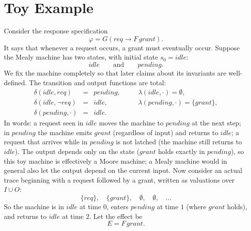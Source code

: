 \documentclass[11pt]{article}
\theoremstyle{remark}
\begin{document}
\section{Toy Example}
\label{sec:toy}

Consider the response specification
\[
  \varphi = G(req\rightarrow F\,grant).
\]
It says that whenever a request occurs, a grant must eventually occur. Suppose
the Mealy machine has two states, with initial state \(s_0=idle\):
\[
  idle
  \qquad\text{and}\qquad
  pending .
\]
We fix the machine completely so that later claims about its invariants are
well-defined. The transition and output functions are total:
\[
\begin{array}{rclcl}
  \delta(idle,req)&=&pending, &\quad& \lambda(idle,\cdot)=\emptyset,\\
  \delta(idle,\neg req)&=&idle, &\quad& \lambda(pending,\cdot)=\{grant\},\\
  \delta(pending,\cdot)&=&idle. & &
\end{array}
\]
In words: a request seen in \(idle\) moves the machine to \(pending\) at the next
step; in \(pending\) the machine emits \(grant\) (regardless of input) and
returns to \(idle\); a request that arrives while in \(pending\) is not latched
(the machine still returns to \(idle\)). The output depends only on the state
(\(grant\) holds exactly in \(pending\)), so this toy machine is effectively a
Moore machine; a Mealy machine would in general also let the output depend on the
current input.
Now consider an actual trace beginning with a request followed by a grant,
written as valuations over \(I\cup O\):
\[
  \{req\},\quad \{grant\},\quad \emptyset,\quad \emptyset,\quad \ldots
\]
So the machine is in \(idle\) at time \(0\), enters \(pending\) at time \(1\)
(where \(grant\) holds), and returns to \(idle\) at time \(2\). Let the effect
be
\[
  E = F\,grant .
\]
\end{document}
